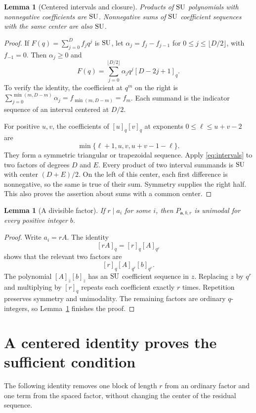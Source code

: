 \documentclass[11pt]{article}
\theoremstyle{research}
\newtheorem{lemma}[theorem]{Lemma}
\theoremstyle{definition}
\newcommand{\qi}[1]{[#1]_q}
\newcommand{\qir}[2]{[#1]_{q^{#2}}}
\newcommand{\SU}{\textup{SU}}
\numberwithin{equation}{section}
\begin{document}
\begin{lemma}[Centered intervals and closure]\label{lem:closure}
Products of $\SU$ polynomials with nonnegative coefficients are $\SU$.
Nonnegative sums of $\SU$ coefficient sequences with the same center are
also $\SU$.
\end{lemma}
\begin{proof}
If $F(q)=\sum_{j=0}^D f_jq^j$ is $\SU$, let
$\alpha_j=f_j-f_{j-1}$ for $0\le j\le\lfloor D/2\rfloor$, with
$f_{-1}=0$. Then $\alpha_j\ge0$ and
\begin{equation}\label{eq:intervals}
 F(q)=\sum_{j=0}^{\lfloor D/2\rfloor}
          \alpha_j q^j\qi{D-2j+1}.
\end{equation}
To verify the identity, the coefficient at $q^m$ on the right is
$\sum_{j=0}^{\min(m,D-m)}\alpha_j=f_{\min(m,D-m)}=f_m$.
Each summand is the indicator sequence of an interval centered at $D/2$.

For positive $u,v$, the coefficients of $\qi{u}\qi{v}$ at exponents
$0\le\ell\le u+v-2$ are
\[
 \min\{\ell+1,u,v,u+v-1-\ell\}.
\]
They form a symmetric triangular or trapezoidal sequence.
Apply \eqref{eq:intervals} to two factors of degrees $D$ and $E$.
Every product of two interval summands is $\SU$ with center $(D+E)/2$.
On the left of this center, each first difference is nonnegative, so the
same is true of their sum. Symmetry supplies the right half. This also
proves the assertion about sums with a common center.
\end{proof}

\begin{lemma}[A divisible factor]\label{lem:divisible}
If $r\mid a_i$ for some $i$, then $P_{\boldsymbol a,b,r}$ is unimodal for
every positive integer $b$.
\end{lemma}
\begin{proof}
Write $a_i=rA$. The identity
\[
 \qi{rA}=\qi r\qir A r
\]
shows that the relevant two factors are
\[
 \qi r\qir A r\qir b r.
\]
The polynomial $[A]_z[b]_z$ has an $\SU$ coefficient sequence in $z$.
Replacing $z$ by $q^r$ and multiplying by $\qi r$ repeats each coefficient
exactly $r$ times. Repetition preserves symmetry and unimodality.
The remaining factors are ordinary $q$-integers, so
Lemma~\ref{lem:closure} finishes the proof.
\end{proof}

\section{A centered identity proves the sufficient condition}
\label{sec:sufficiency}
The following identity removes one block of length $r$ from an ordinary
factor and one term from the spaced factor, without changing the center
of the residual sequence.
\end{document}
